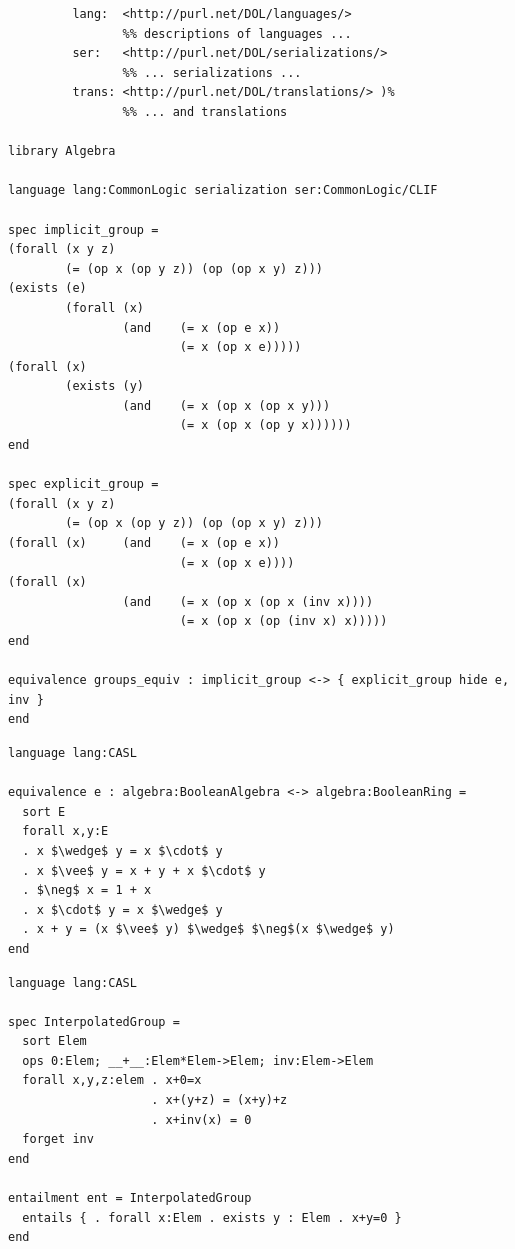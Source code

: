 \documentclass[10pt, a4paper]{isov2}
\begin{document}

\label{ex:algebra}


\begin{lstlisting}[basicstyle=\ttfamily,language=dolText,alsolanguage=clif,escapechar=@,mathescape]
%prefix( :      <http://www.example.org/algebra#>
         lang:  <http://purl.net/DOL/languages/>
                %% descriptions of languages ...
         ser:   <http://purl.net/DOL/serializations/>
                %% ... serializations ...
         trans: <http://purl.net/DOL/translations/> )%
                %% ... and translations

library Algebra

language lang:CommonLogic serialization ser:CommonLogic/CLIF

spec implicit_group =
(forall (x y z)
        (= (op x (op y z)) (op (op x y) z)))
(exists (e)
        (forall (x)
                (and    (= x (op e x))
                        (= x (op x e)))))
(forall (x)
        (exists (y)
                (and    (= x (op x (op x y)))
                        (= x (op x (op y x))))))
end

spec explicit_group =
(forall (x y z)
        (= (op x (op y z)) (op (op x y) z)))
(forall (x)     (and    (= x (op e x))
                        (= x (op x e))))
(forall (x)
                (and    (= x (op x (op x (inv x))))
                        (= x (op x (op (inv x) x)))))
end

equivalence groups_equiv : implicit_group <-> { explicit_group hide e, inv }
end
\end{lstlisting}

\begin{lstlisting}[basicstyle=\ttfamily,language=dolText,alsolanguage=clif,escapechar=@,mathescape]
language lang:CASL

equivalence e : algebra:BooleanAlgebra <-> algebra:BooleanRing =
  sort E
  forall x,y:E
  . x $\wedge$ y = x $\cdot$ y
  . x $\vee$ y = x + y + x $\cdot$ y
  . $\neg$ x = 1 + x
  . x $\cdot$ y = x $\wedge$ y
  . x + y = (x $\vee$ y) $\wedge$ $\neg$(x $\wedge$ y)
end
\end{lstlisting}

\begin{lstlisting}[basicstyle=\ttfamily,language=dolText,alsolanguage=CASL,escapechar=@,mathescape]
language lang:CASL

spec InterpolatedGroup =
  sort Elem
  ops 0:Elem; __+__:Elem*Elem->Elem; inv:Elem->Elem
  forall x,y,z:elem . x+0=x
                    . x+(y+z) = (x+y)+z
                    . x+inv(x) = 0
  forget inv
end

entailment ent = InterpolatedGroup
  entails { . forall x:Elem . exists y : Elem . x+y=0 }
end
\end{lstlisting}
\end{document}
